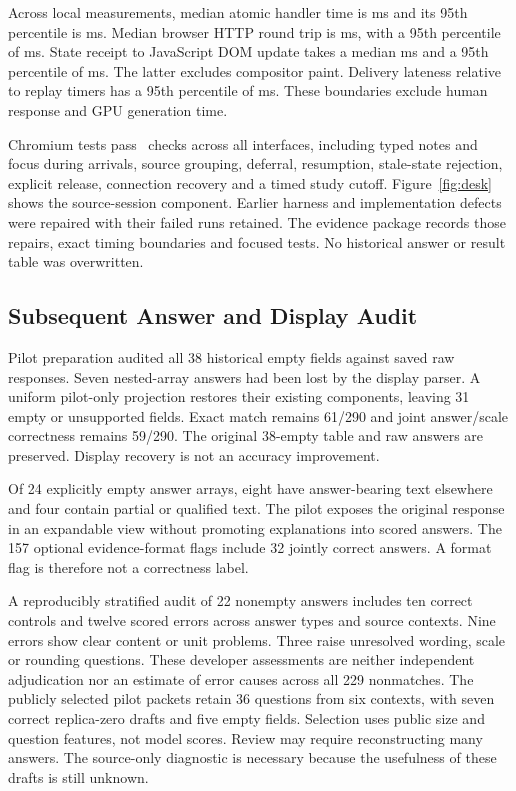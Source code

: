 \documentclass[a4paper,twoside]{article}
\begin{document}
Across local measurements, median atomic handler time is \HandlerMedian{} ms and its 95th
percentile is \HandlerPHigh{} ms. Median browser HTTP round trip is \HttpMedian{} ms, with a 95th
percentile of \HttpPHigh{} ms. State receipt to JavaScript DOM update takes a median
\DomMedian{} ms and a 95th percentile of \DomPHigh{} ms. The latter excludes compositor paint.
Delivery lateness relative to replay timers has a 95th percentile of \DeliveryPHigh{} ms.
These boundaries exclude human response and GPU generation time.

Chromium tests pass \BrowserChecks\ checks across all interfaces, including typed
notes and focus during arrivals, source grouping, deferral, resumption, stale-state
rejection, explicit release, connection recovery and a timed study cutoff.
Figure~\ref{fig:desk} shows the source-session component.
Earlier harness and implementation defects were repaired with their failed runs
retained. The evidence package records those repairs, exact timing boundaries and
focused tests. No historical answer or result table was overwritten.





\subsection{Subsequent Answer and Display Audit}
Pilot preparation audited all 38 historical empty fields against saved raw responses.
Seven nested-array answers had been lost by the display parser. A uniform pilot-only
projection restores their existing components, leaving 31 empty or unsupported
fields. Exact match remains 61/290 and joint answer/scale correctness remains
59/290. The original 38-empty table and raw answers are preserved. Display recovery
is not an accuracy improvement.

Of 24 explicitly empty answer arrays, eight have answer-bearing text elsewhere
and four contain partial or qualified text. The pilot exposes the original response
in an expandable view without promoting explanations into scored answers. The
157 optional evidence-format flags include 32 jointly correct answers. A format
flag is therefore not a correctness label.

A reproducibly stratified audit of 22 nonempty answers includes ten correct controls
and twelve scored errors across answer types and source contexts. Nine errors show
clear content or unit problems. Three raise unresolved wording, scale or rounding
questions. These developer assessments are neither independent adjudication nor
an estimate of error causes across all 229 nonmatches. The publicly selected pilot
packets retain 36 questions from six contexts, with seven correct replica-zero
drafts and five empty fields. Selection uses public size and question features,
not model scores. Review may require reconstructing many answers. The source-only
diagnostic is necessary because the usefulness of these drafts is still unknown.
\end{document}
